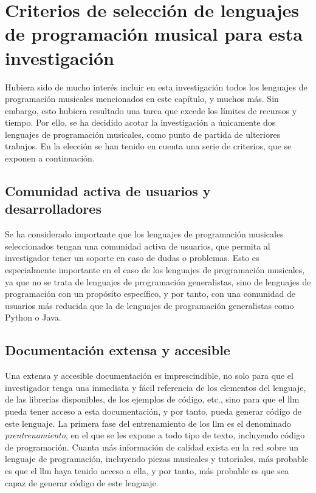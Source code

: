 \section{Criterios de selección de lenguajes de programación musical para esta investigación}

Hubiera sido de mucho interés incluir en esta investigación todos los lenguajes de programación musicales mencionados en este capítulo, y muchos más. Sin embargo, esto hubiera resultado una tarea que excede los límites de recursos y tiempo. Por ello, se ha decidido acotar la investigación a únicamente dos lenguajes de programación musicales, como punto de partida de ulteriores trabajos. En la elección se han tenido en cuenta una serie de criterios, que se exponen a continuación.


\subsection{Comunidad activa de usuarios y desarrolladores} 
Se ha considerado importante que los lenguajes de programación musicales seleccionados tengan una comunidad activa de usuarios, que permita al investigador tener un soporte en caso de dudas o problemas. Esto es especialmente importante en el caso de los lenguajes de programación musicales, ya que no se trata de lenguajes de programación generalistas, sino de lenguajes de programación con un propósito específico, y por tanto, con una comunidad de usuarios más reducida que la de lenguajes de programación generalistas como Python o Java.

\subsection{Documentación extensa y accesible}
Una extensa y accesible documentación es imprescindible, no solo para que el investigador tenga una inmediata y fácil referencia de los elementos del lenguaje, de las librerías disponibles, de los ejemplos de código, etc., sino para que el \gls{llm} pueda tener acceso a esta documentación, y por tanto, pueda generar código de este lenguaje. La primera fase del entrenamiento de los \gls{llm} es el denominado \emph{prentrenamiento}, en el que se les expone a todo tipo de texto, incluyendo código de programación. Cuanta más información de calidad exista en la red sobre un lenguaje de programación, incluyendo piezas musicales y tutoriales, más probable es que el \gls{llm} haya tenido acceso a ella, y por tanto, más probable es que sea capaz de generar código de este lenguaje.


